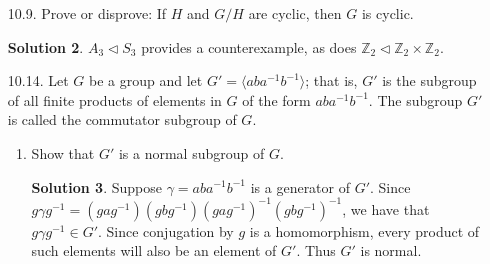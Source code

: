 \documentclass{article}
\newcommand{\ZZ}{\mathbb{Z}}
\theoremstyle{definition}
\newtheorem*{solution}{Solution}
\begin{document}
\begin{enumerate}
\begin{solution}
$U \triangleleft T$ from the previous problem provides a counterexample, as does $A_3 \triangleleft S_3$.
\end{solution}
\item[10.9.] Prove or disprove: If $H$ and $G/H$ are cyclic, then $G$ is cyclic.
\begin{solution}
$A_3 \triangleleft S_3$ provides a counterexample, as does $\ZZ_2 \triangleleft \ZZ_2 \times \ZZ_2$.
\end{solution}
\item[10.14.] Let $G$ be a group and let $G' = \langle aba^{-1}b^{-1} \rangle$; that is, $G'$ is the subgroup of all finite products of elements in $G$ of the form $aba^{-1}b^{-1}$. The subgroup $G'$ is called the commutator subgroup of $G$.
\begin{enumerate}
\item Show that $G'$ is a normal subgroup of $G$.
\begin{solution}
Suppose $\gamma = aba^{-1}b^{-1}$ is a generator of $G'$.  Since $g\gamma g^{-1} = (gag^{-1})(gbg^{-1})(gag^{-1})^{-1}(gbg^{-1})^{-1}$, we have that $g\gamma g^{-1} \in G'$.  Since conjugation by $g$ is a homomorphism, every product of such elements will also be an element of $G'$.  Thus $G'$ is normal.


\end{solution}
\end{enumerate}
\end{enumerate}
\end{document}
